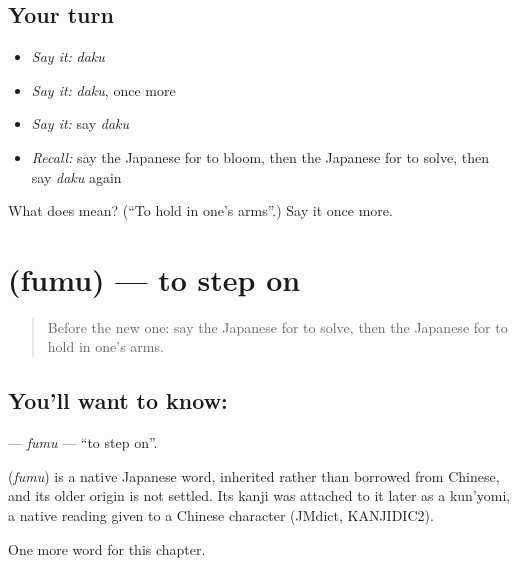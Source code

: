 \subsection*{Your turn}
\begin{itemize}
\raggedright
  \item \emph{Say it:} \emph{daku}
  \item \emph{Say it:} \emph{daku}, once more
  \item \emph{Say it:} say \emph{daku}
  \item \emph{Recall:} say the Japanese for to bloom, then the Japanese for to solve, then say \emph{daku} again
\end{itemize}

\begin{tcolorbox}[breakable,colback=teal!4,colframe=teal!35!black,title={Before you move on}]
What does  mean? (\textquotedblleft{}To hold in one's arms\textquotedblright{}.) Say it once more.
\end{tcolorbox}
\section[\texorpdfstring{\ja{ふむ} (fumu)}{ふむ (fumu)}]{ (fumu) — to step on}

\label{lesson:JA-C86-fumu}



\begin{quote}
Before the new one: say the Japanese for to solve, then the Japanese for to hold in one's arms.
\end{quote}

\subsection*{You'll want to know: }
\textbf{} — \emph{fumu} — \textquotedblleft{}to step on\textquotedblright{}.

\begin{cousinweb}
\textbf{} (\emph{fumu}) is a native Japanese word, inherited rather than borrowed from Chinese, and its older origin is not settled. Its kanji was attached to it later as a kun'yomi, a native reading given to a Chinese character (JMdict, KANJIDIC2).
\end{cousinweb}

\begin{grammarlens}[title={What you've built}]
One more word for this chapter.
\end{grammarlens}

